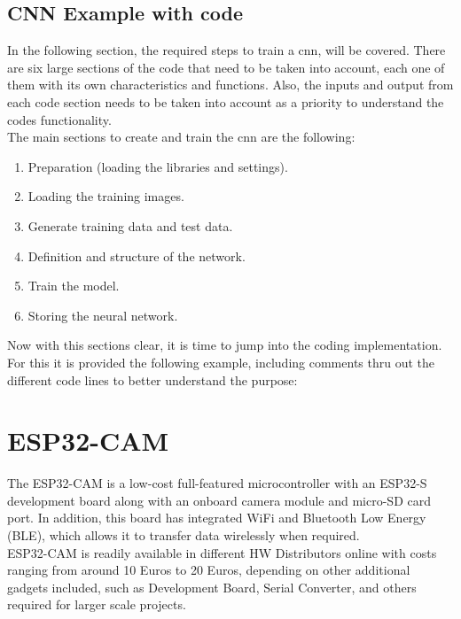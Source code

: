 \subsection{CNN Example with code}
In the following section, the required steps to train a \ac{cnn}, will be covered. There are six large sections of the code that need to be taken into account, each one of them with its own characteristics and functions. Also, the inputs and output from each code section needs to be taken into account as a priority to understand the codes functionality. \\

The main sections to create and train the \ac{cnn} are the following:  
\begin{enumerate}
	\item Preparation (loading the libraries and settings).
	\item Loading the training images.
	\item Generate training data and test data.
	\item Definition and structure of the network.
	\item Train the model.
	\item Storing the neural network.
\end{enumerate}

Now with this sections clear, it is time to jump into the coding implementation. For this it is provided the following example, including comments thru out the different code lines to better understand the purpose: 



\autocite{Muller:2020}

\section{ESP32-CAM}\label{ESP32description}
The ESP32-CAM is a low-cost full-featured microcontroller with an ESP32-S development board along with an onboard camera module and micro-SD card port. In addition, this board has integrated WiFi and Bluetooth Low Energy (BLE), which allows it to transfer data wirelessly when required.\\

ESP32-CAM is readily available in different HW Distributors online with costs ranging from around 10 Euros to 20 Euros, depending on other additional gadgets included, such as Development Board, Serial Converter, and others required for larger scale projects.\\

